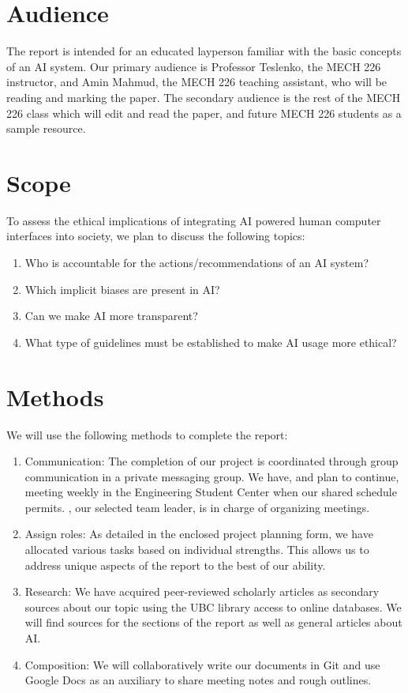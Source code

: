 \documentclass[letterpaper,11pt]{memo} %
\begin{document}
\section{Audience}
The report is intended for an educated layperson familiar with the basic concepts of an AI system. 
Our primary audience is Professor Teslenko, the MECH 226 instructor, and  Amin Mahmud, the MECH 226 teaching assistant, who will be reading and marking the paper. 
The secondary audience is the rest of the MECH 226 class which will edit and read the paper, and future MECH 226 students as a sample resource.


\setcounter{page}{2}

\section{Scope}
To assess the ethical implications of integrating AI powered human computer interfaces into society, we plan to discuss the following topics: 
\begin{enumerate}
	\item Who is accountable for the actions/recommendations of an AI system?
	\item Which implicit biases are present in AI?
	\item Can we make AI more transparent?
	\item What type of guidelines must be established to make AI usage more ethical?
\end{enumerate}

\section{Methods}
We will use the following methods to complete the report:
\begin{enumerate}
	\item Communication: 
	The completion of our project is coordinated through group communication in a private messaging group. 
	We have, and plan to continue, meeting weekly in the Engineering Student Center when our shared schedule permits. 
	, our selected team leader, is in charge of organizing meetings.
	\item Assign roles: 
	As detailed in the enclosed project planning form, we have allocated various tasks based on individual strengths. 
	This allows us to address unique aspects of the report to the best of our ability. 
	\item Research: 
	We have acquired peer-reviewed scholarly articles as secondary sources about our topic using the UBC library access to online databases. 
	We will find sources for the sections of the report as well as general articles about AI.
	\item Composition: 
	We will collaboratively write our documents in Git and use Google Docs as an auxiliary to share meeting notes and rough outlines. 
\end{enumerate}
\end{document}
